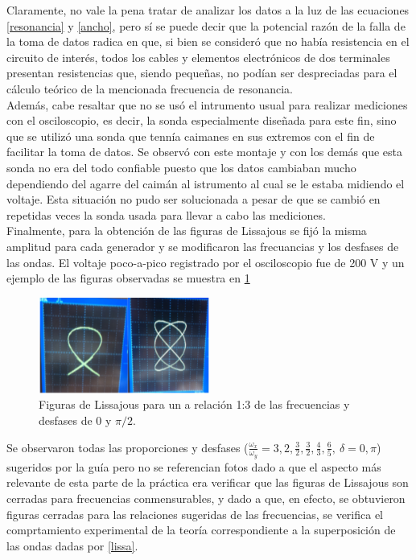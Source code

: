 \documentclass[prb,aps,twocolumn,preprintnumbers,amsmath,amssymb]{revtex4}
\begin{document}
Claramente, no vale la pena tratar de analizar los datos a la luz de las ecuaciones \eqref{resonancia} y \eqref{ancho}, pero sí se puede decir que la potencial razón de la falla de la toma de datos radica en que, si bien se consideró que no había resistencia en el circuito de interés, todos los cables y elementos electrónicos de dos terminales presentan resistencias que, siendo pequeñas, no podían ser despreciadas para el cálculo teórico de la mencionada frecuencia de resonancia. \\

Además, cabe resaltar que no se usó el intrumento usual para realizar mediciones con el osciloscopio, es decir, la sonda especialmente diseñada para este fin, sino que se utilizó una sonda que tennía caimanes en sus extremos con el fin de facilitar la toma de datos. Se observó con este montaje y con los demás que esta sonda no era del todo confiable puesto que los datos cambiaban mucho dependiendo del agarre del caimán al istrumento al cual se le estaba midiendo el voltaje. Esta situación no pudo ser solucionada a pesar de que se cambió en repetidas veces la sonda usada para llevar a cabo las mediciones.\\

Finalmente, para la obtención de las figuras de Lissajous se fijó la misma amplitud para cada generador y se modificaron las frecuancias y los desfases de las ondas. El voltaje poco-a-pico registrado por el osciloscopio fue de 200 V y un ejemplo de las figuras observadas se muestra en \ref{fig: lissa}

\begin{figure}[h!]
	\centering
	\includegraphics[width=0.5\textwidth,height=0.2\textheight]{lissa}
	\caption{Figuras de Lissajous para un a relación 1:3 de las frecuencias y desfases de 0 y  $\pi /2$.}
	\label{fig: lissa}
\end{figure}

Se observaron todas las proporciones y desfases ($\frac{\omega_{x}}{\omega_{y}} = 3, 2, \frac{3}{2}, \frac{3}{2}, \frac{4}{3}, \frac{6}{5},\ \delta = 0, \pi$) sugeridos por la guía pero no se referencian fotos dado a que el aspecto más relevante de esta parte de la práctica era verificar que las figuras de Lissajous son cerradas para frecuencias conmensurables, y dado a que, en efecto, se obtuvieron figuras cerradas para las relaciones sugeridas de las frecuencias, se verifica el comprtamiento experimental de la teoría correspondiente a la superposición de las ondas dadas por \eqref{lissa}.
\end{document}
